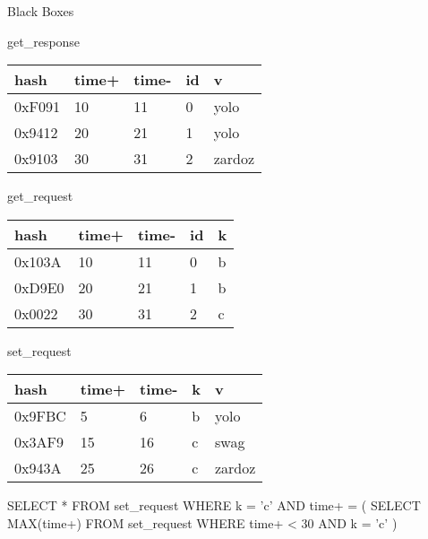\begin{block}{Black Boxes}
  \begin{center}
    \ttfamily

    \begin{minipage}{0.47\textwidth}
      get\_response

      \vspace{0.5cm}

      \begin{tabular}{|l|l|l|l|l|}
        \hline\rowcolor{red!20}
        hash   & time+ & time- & id & v \\\hline
        0xF091 & 10    & 11    & 0  & yolo \\\hline
        0x9412 & 20    & 21    & 1  & yolo \\\hline
        0x9103 & 30    & 31    & 2  & zardoz \\\hline
      \end{tabular}
    \end{minipage}
    \hfill
    \begin{minipage}{0.47\textwidth}
      get\_request

      \vspace{0.5cm}

      \begin{tabular}{|l|l|l|l|l|}
        \hline\rowcolor{green!20}
        hash   & time+ & time- & id & k \\\hline
        0x103A & 10    & 11    & 0  & b \\\hline
        0xD9E0 & 20    & 21    & 1  & b \\\hline
        0x0022 & 30    & 31    & 2  & c \\\hline
      \end{tabular}
    \end{minipage}

    \vspace{1cm}

    \begin{minipage}{0.47\textwidth}
      set\_request

      \vspace{0.5cm}

      \begin{tabular}{|l|l|l|l|l|}
        \hline\rowcolor{blue!20}
        hash   & time+ & time- & k & v \\\hline
        0x9FBC & 5     & 6     & b & yolo \\\hline
        0x3AF9 & 15    & 16    & c & swag \\\hline
        0x943A & 25    & 26    & c & zardoz \\\hline
      \end{tabular}
    \end{minipage}
    \hfill
    \begin{minipage}{0.47\textwidth}
      \small
      \begin{SQL}
SELECT *
FROM set_request
WHERE k = 'c' AND time+ = (
  SELECT MAX(time+)
  FROM set_request
  WHERE time+ < 30 AND k = 'c'
)
      \end{SQL}
    \end{minipage}
  \end{center}
\end{block}
